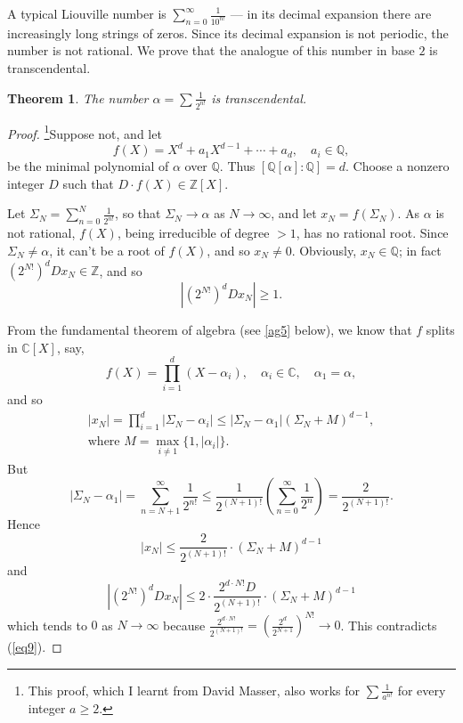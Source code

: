 \documentclass[a4paper,11pt,final,openany]{memoir}
\newtheorem{theorem}[X]{Theorem}
\theoremstyle{nonumberplain}
\newtheorem{proof}{Proof.}
\begin{document}
A typical Liouville number is $\sum_{n=0}^{\infty}\frac{1}{10^{n!}}$ --- in
its decimal expansion there are increasingly long strings of zeros. Since its
decimal expansion is not periodic, the number is not rational. We prove that
the analogue of this number in base $2$ is transcendental.

\begin{theorem}
\label{ef23}%
%
The number $\alpha=\sum\frac{1}{2^{n!}}$ is transcendental.
\end{theorem}

\begin{proof}
\footnote{This proof, which I learnt from David Masser, also works for $%
{\textstyle\sum}
\frac{1}{a^{n!}}$ for every integer $a\geq2$.}Suppose not, and let
\[
f(X)=X^{d}+a_{1}X^{d-1}+\cdots+a_{d},\quad a_{i}\in\mathbb{Q},
\]
be the minimal polynomial of $\alpha$ over $\mathbb{Q}$. Thus $[\mathbb{Q}%
[\alpha]\colon\mathbb{Q}]=d$. Choose a nonzero integer $D$ such that $D\cdot
f(X)\in\mathbb{Z}[X]$.

Let $\Sigma_{N}=\sum_{n=0}^{N}\frac{1}{2^{n!}}$, so that $\Sigma
_{N}\rightarrow\alpha$ as $N\rightarrow\infty$, and let $x_{N}=f(\Sigma_{N})$.
As $\alpha$ is not rational, $f(X)$, being irreducible of degree $>1$, has no
rational root. Since $\Sigma_{N}\neq\alpha$, it can't be a root of $f(X)$, and
so $x_{N}\neq0$. Obviously, $x_{N}\in\mathbb{Q}$; in fact $(2^{N!})^{d}%
Dx_{N}\in\mathbb{Z}$, and so
\begin{equation}
|(2^{N!})^{d}Dx_{N}|\geq1\text{.} \label{eq9}%
\end{equation}


From the fundamental theorem of algebra%
(see \ref{ag5} below), we know that $f$ splits in $\mathbb{C}{}[X]$, say,%
\[
f(X)=\prod_{i=1}^{d}(X-\alpha_{i}),\quad\alpha_{i}\in\mathbb{C},\quad
\alpha_{1}=\alpha,
\]
and so
\begin{align*}
|x_{N}|=\prod_{i=1}^{d}|\Sigma_{N}-\alpha_{i}|\leq|\Sigma_{N}-\alpha
_{1}|(\Sigma_{N}+M)^{d-1},\\
\text{where }M=\max_{i\neq1}\{1,|\alpha
_{i}|\}\text{.}%
\end{align*}
But
\[
|\Sigma_{N}-\alpha_{1}|=\sum_{n=N+1}^{\infty}\frac{1}{2^{n!}}\leq\frac
{1}{2^{(N+1)!}}\left(  \sum_{n=0}^{\infty}\frac{1}{2^{n}}\right)  =\frac
{2}{2^{(N+1)!}}.
\]
Hence%
\[
|x_{N}|\leq\frac{2}{2^{(N+1)!}}\cdot(\Sigma_{N}+M)^{d-1}%
\]
and
\[
|(2^{N!})^{d}Dx_{N}|\leq2\cdot\frac{2^{d\cdot N!}D}{2^{(N+1)!}}\cdot
(\Sigma_{N}+M)^{d-1}%
\]
which tends to $0$ as $N\rightarrow\infty$ because $\frac{2^{d\cdot N!}%
}{2^{(N+1)!}}=\left(  \frac{2^{d}}{2^{N+1}}\right)  ^{N!}\rightarrow0$. This
contradicts (\ref{eq9}).
\end{proof}
\end{document}
